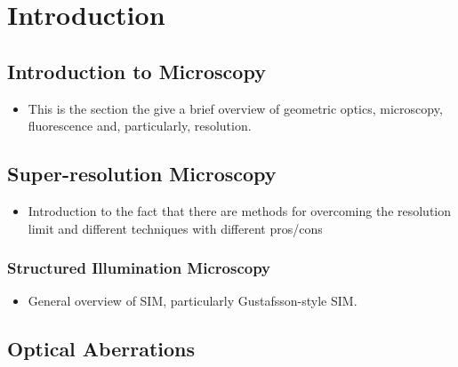 \chapter{Introduction}

\section{Introduction to Microscopy}
\label{sec:microscopy}

\begin{itemize}
	\item This is the section the give a brief overview of geometric optics, microscopy, fluorescence and, particularly, resolution.
\end{itemize}

\section{Super-resolution Microscopy}
\label{sec:super_res}

\begin{itemize}
	\item Introduction to the fact that there are methods for overcoming the resolution limit and different techniques with different pros/cons
\end{itemize}

	\subsection{Structured Illumination Microscopy}
	\label{subsec:SIM}
	
		\begin{itemize}
			\item General overview of SIM, particularly Gustafsson-style SIM.
		\end{itemize}
	
	

\section{Optical Aberrations}
\label{sec:aberrations}

